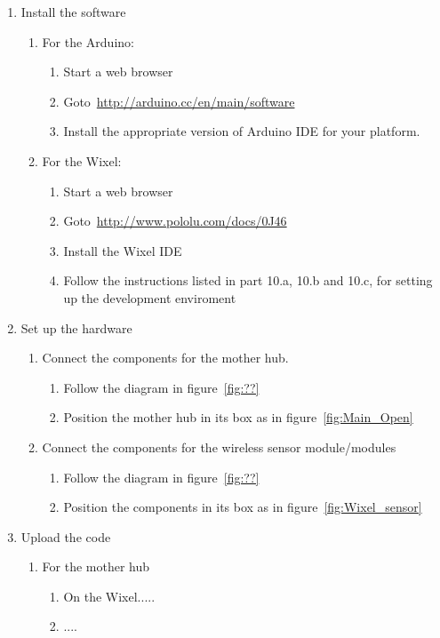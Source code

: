 \begin{enumerate}
\item Install the software
	\begin{enumerate}
	\item For the Arduino:
		\begin{enumerate}
		\item Start a web browser
		\item Goto~\url{http://arduino.cc/en/main/software}
		\item Install the appropriate version of Arduino IDE for your platform.
		\end{enumerate}
	\item For the Wixel:
		\begin{enumerate}
		\item Start a web browser
		\item Goto~\url{http://www.pololu.com/docs/0J46}
		\item Install the Wixel IDE
		\item Follow the instructions listed in part 10.a, 10.b and 10.c, for setting up the development enviroment
		\end{enumerate}
	\end{enumerate}
\item Set up the hardware
	\begin{enumerate}
	\item Connect the components for the mother hub.
		\begin{enumerate}
		\item Follow the diagram in figure~\ref{fig:??}
		\item Position the mother hub in its box as in figure~\ref{fig:Main_Open}
		\end{enumerate}
	\item Connect the components for the wireless sensor module/modules
		\begin{enumerate}
		\item Follow the diagram in figure~\ref{fig:??}
		\item Position the components in its box as in figure~\ref{fig:Wixel_sensor}
		\end{enumerate}
	\end{enumerate}
\item Upload the code
	\begin{enumerate}
	\item For the mother hub
		\begin{enumerate}
		\item On the Wixel..... %
		\item ....
		\end{enumerate}
	\end{enumerate} 
\end{enumerate}

